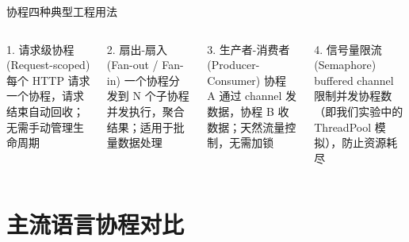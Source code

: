\begin{frame}{协程四种典型工程用法}
  \begin{columns}[T]
    \begin{block}{\textcolor{midblue}{1.} 请求级协程 (Request-scoped)}
      {\footnotesize 每个 HTTP 请求一个协程，请求结束自动回收；无需手动管理生命周期}
    \end{block}
    \vspace{0.2em}
    \begin{exampleblock}{\textcolor{corGreen}{2.} 扇出-扇入 (Fan-out / Fan-in)}
      {\footnotesize 一个协程分发到 N 个子协程并发执行，聚合结果；适用于批量数据处理}
    \end{exampleblock}

    \begin{block}{\textcolor{midblue}{3.} 生产者-消费者 (Producer-Consumer)}
      {\footnotesize 协程 A 通过 channel 发数据，协程 B 收数据；天然流量控制，无需加锁}
    \end{block}
    \vspace{0.2em}
    \begin{exampleblock}{\textcolor{corGreen}{4.} 信号量限流 (Semaphore)}
      {\footnotesize buffered channel 限制并发协程数（即我们实验中的 ThreadPool 模拟），防止资源耗尽}
    \end{exampleblock}
  \end{columns}
\end{frame}

\section{主流语言协程对比}

